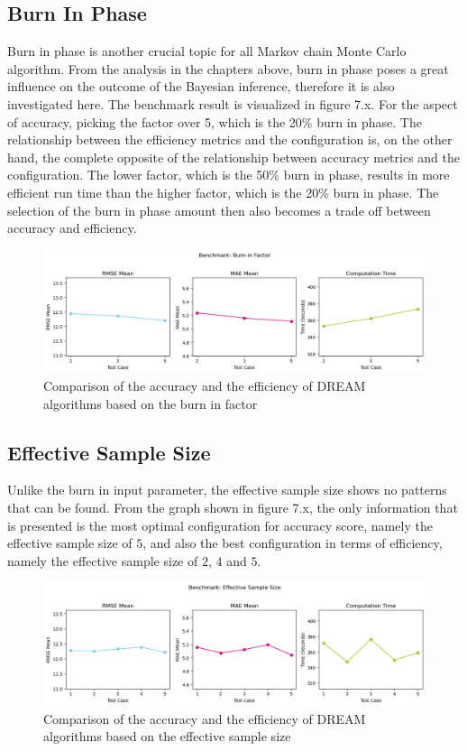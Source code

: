 \subsection{Burn In Phase}
Burn in phase is another crucial topic for all Markov chain Monte Carlo algorithm. From the analysis in the chapters above, burn in phase poses a great influence on the outcome of the Bayesian inference, therefore it is also investigated here. The benchmark result is visualized in figure 7.x. For the aspect of accuracy, picking the factor over 5, which is the 20\% burn in phase. The relationship between the efficiency metrics and the configuration is, on the other hand, the complete opposite of the relationship between accuracy metrics and the configuration. The lower factor, which is the 50\% burn in phase, results in more efficient run time than the higher factor, which is the 20\% burn in phase. The selection of the burn in phase amount then also becomes a trade off between accuracy and efficiency.
\begin{figure}[H]
    \centering
    \includegraphics[width=1\textwidth]{figures/dream/burn_in.png}
    \captionsetup{width=.8\textwidth}
    \caption{Comparison of the accuracy and the efficiency of DREAM algorithms based on the burn in factor}
    \label{fig:enter-label}
\end{figure}

\subsection{Effective Sample Size}
Unlike the burn in input parameter, the effective sample size shows no patterns that can be found. From the graph shown in figure 7.x, the only information that is presented is the most optimal configuration for accuracy score, namely the effective sample size of $5$, and also the best configuration in terms of efficiency, namely the effective sample size of $2$, $4$ and $5$.
\begin{figure}[H]
    \centering
    \includegraphics[width=1\textwidth]{figures/dream/ess.png}
    \captionsetup{width=.8\textwidth}
    \caption{Comparison of the accuracy and the efficiency of DREAM algorithms based on the effective sample size}
    \label{fig:enter-label}
\end{figure}